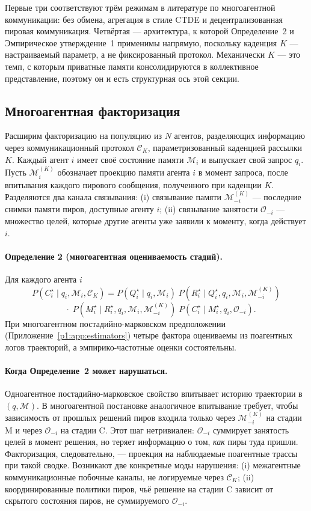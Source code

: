 \documentclass{article}
\begin{document}
Первые три соответствуют трём режимам в литературе по многоагентной
коммуникации: без обмена, агрегация в стиле CTDE и
децентрализованная пировая коммуникация. Четвёртая --- архитектура, к
которой Определение~2 и Эмпирическое утверждение~1 применимы
напрямую, поскольку каденция $K$ --- настраиваемый параметр, а не
фиксированный протокол. Механически $K$ --- это темп, с которым приватные
памяти консолидируются в коллективное представление, поэтому он и есть
структурная ось этой секции.

\subsection{Многоагентная факторизация}
\label{p1:sec:multi-theory}

Расширим факторизацию на популяцию из $N$ агентов, разделяющих
информацию через коммуникационный протокол $\mathcal{C}_K$,
параметризованный каденцией рассылки $K$. Каждый агент $i$ имеет своё
состояние памяти $\mathcal{M}_i$ и выпускает свой запрос $q_i$. Пусть
$\mathcal{M}_i^{(K)}$ обозначает проекцию памяти агента $i$ в
момент запроса, после впитывания каждого пирового сообщения, полученного
при каденции $K$. Разделяются два канала связывания: (i) связывание
памяти $\mathcal{M}_{-i}^{(K)}$ --- последние снимки памяти пиров,
доступные агенту $i$; (ii) связывание занятости $\mathcal{O}_{-i}$ ---
множество целей, которые другие агенты уже заявили к моменту,
когда действует $i$.

\paragraph{Определение 2 (многоагентная оцениваемость стадий).}
Для каждого агента $i$
\[
P(C^\star_i \mid q_i, \mathcal{M}_i, \mathcal{C}_K)
=
P(Q^\star_i \mid q_i, \mathcal{M}_i)\;
P(R^\star_i \mid Q^\star_i, q_i, \mathcal{M}_i, \mathcal{M}_{-i}^{(K)})
\]
\[
\quad \cdot\;
P(M^\star_i \mid R^\star_i, q_i, \mathcal{M}_i, \mathcal{M}_{-i}^{(K)})\;
P(C^\star_i \mid M^\star_i, q_i, \mathcal{O}_{-i}).
\]
При многоагентном постадийно-марковском предположении
(Приложение~\ref{p1:app:estimators}) четыре фактора оцениваемы из
поагентных логов траекторий, а эмпирико-частотные оценки
состоятельны.

\paragraph{Когда Определение~2 может нарушаться.}
Одноагентное постадийно-марковское свойство впитывает историю траектории в
$(q, \mathcal{M})$. В многоагентной постановке аналогичное
впитывание требует, чтобы зависимость от прошлых решений пиров входила только
через $\mathcal{M}_{-i}^{(K)}$ на стадии M и через
$\mathcal{O}_{-i}$ на стадии C. Этот шаг нетривиален:
$\mathcal{O}_{-i}$ суммирует занятость целей в момент решения, но
теряет информацию о том, \emph{как} пиры туда пришли.
Факторизация, следовательно, --- проекция на наблюдаемые поагентные
трассы при такой сводке. Возникают две конкретные моды нарушения: (i)
межагентные коммуникационные побочные каналы, не логируемые через
$\mathcal{C}_K$; (ii) координированные политики пиров, чьё решение на
стадии C зависит от скрытого состояния пиров, не суммируемого
$\mathcal{O}_{-i}$.
\end{document}
